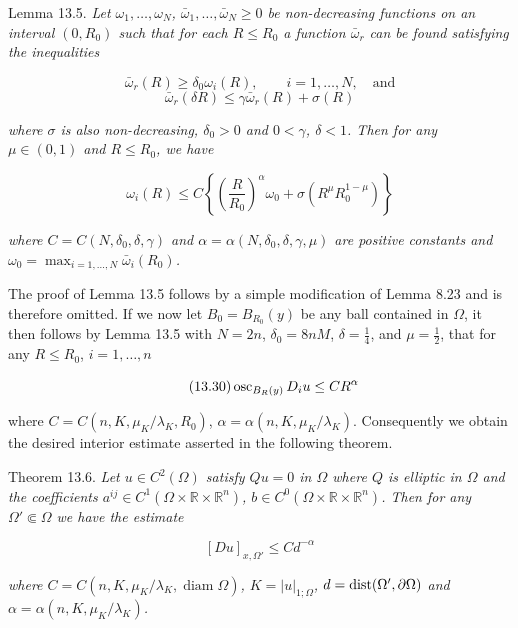 \begin{lemma}\label{lem:gt13-holder-gradient-13-5}
Lemma 13.5. \emph{Let $\omega_1,\dots,\omega_N$, $\bar{\omega}_1,\dots,\bar{\omega}_N\ge 0$ be non-decreasing functions on an interval $(0,R_0)$ such that for each $R\le R_0$ a function $\bar{\omega}_r$ can be found satisfying the inequalities}

\[
\bar{\omega}_r(R)\ge \delta_0\omega_i(R), \qquad i=1,\dots,N, \quad \text{and}
\]
\begin{equation}\tag{13.28}
\bar{\omega}_r(\delta R)\le \gamma \bar{\omega}_r(R)+\sigma(R)
\end{equation}

\emph{where $\sigma$ is also non-decreasing, $\delta_0>0$ and $0<\gamma$, $\delta<1$. Then for any $\mu\in(0,1)$ and $R\le R_0$, we have}

\begin{equation}\tag{13.29}
\omega_i(R)\le C\left\{\left(\frac{R}{R_0}\right)^\alpha \omega_0+\sigma(R^\mu R_0^{1-\mu})\right\}
\end{equation}

\emph{where $C=C(N,\delta_0,\delta,\gamma)$ and $\alpha=\alpha(N,\delta_0,\delta,\gamma,\mu)$ are positive constants and $\omega_0=\max_{i=1,\dots,N}\bar{\omega}_i(R_0)$.}
\end{lemma}

The proof of Lemma 13.5 follows by a simple modification of Lemma 8.23 and is therefore omitted. If we now let $B_0=B_{R_0}(y)$ be any ball contained in $\Omega$, it then follows by Lemma 13.5 with $N=2n$, $\delta_0=8nM$, $\delta=\frac14$, and $\mu=\frac12$, that for any $R\le R_0$, $i=1,\dots,n$

\begin{equation}\tag{13.30}
\operatorname{osc}_{B_R(y)} D_i u \le CR^\alpha
\end{equation}

where $C=C(n,K,\mu_K/\lambda_K,R_0)$, $\alpha=\alpha(n,K,\mu_K/\lambda_K)$. Consequently we obtain the desired interior estimate asserted in the following theorem.

\begin{theorem}\label{thm:gt13-holder-gradient-13-6}
Theorem 13.6. \emph{Let $u\in C^2(\Omega)$ satisfy $Qu=0$ in $\Omega$ where $Q$ is elliptic in $\Omega$ and the coefficients $a^{ij}\in C^1(\Omega\times\mathbb{R}\times\mathbb{R}^n)$, $b\in C^0(\Omega\times\mathbb{R}\times\mathbb{R}^n)$. Then for any $\Omega'\Subset\Omega$ we have the estimate}

\begin{equation}\tag{13.31}
[Du]_{x,\Omega'}\le Cd^{-\alpha}
\end{equation}

\emph{where $C=C(n,K,\mu_K/\lambda_K,\operatorname{diam}\Omega)$, $K=|u|_{1;\Omega}$, $d=\operatorname{dist}(\Omega',\partial\Omega)$ and $\alpha=\alpha(n,K,\mu_K/\lambda_K)$.}
\end{theorem}

